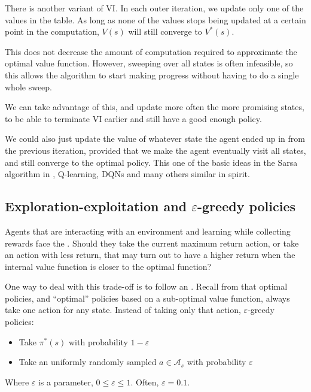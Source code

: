 \citep[Section~4.4]{sutton1998introduction}

There is another variant of \acl{VI}. In each outer iteration, we update only
one of the values in the table. As long as none of the values stops being
updated at a certain point in the computation, $V(s)$ will still converge to $V^*(s)$.

This does not decrease the amount of computation required to approximate the
optimal value function. However, sweeping over all states is often infeasible,
so this allows the algorithm to start making progress without having to do a
single whole sweep.

We can take advantage of this, and update more often the more promising states,
to be able to terminate \acl{VI} earlier and still have a good enough policy.
\citep[Section~4.5]{sutton1998introduction}

 We could also just update the value of whatever state the agent ended up in
from the previous iteration, provided that we make the agent eventually visit
all states, and still converge to the optimal policy. This one of the basic
ideas in the Sarsa algorithm in , Q-learning,
\aclp{DQN} and many others similar in spirit.

\subsection{Exploration-exploitation and \texorpdfstring{$\varepsilon$}{ε}-greedy policies}
Agents that are interacting with an environment and learning while collecting
rewards face the . Should they take the
current maximum return action, or take an action with less return, that may turn
out to have a higher return when the internal value function is closer to the
optimal function?

One way to deal with this trade-off is to follow an
.
Recall from  that optimal policies,
and ``optimal'' policies based on a sub-optimal value function, always take one
action for any state. Instead of taking only that action, $\varepsilon$-greedy
policies:
\begin{itemize}
\item Take $\pi^*(s)$ with probability $1-\varepsilon$
\item Take an uniformly randomly sampled $a\in\mathcal{A}_s$ with probability
$\varepsilon$
\end{itemize}
Where $\varepsilon$ is a parameter, $0\leq\varepsilon\leq 1$. Often,
$\varepsilon=0.1$.


